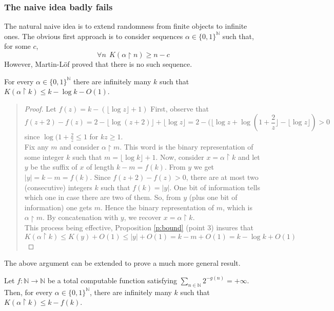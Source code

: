 \subsubsection{The naive idea badly fails}
The natural naive idea is to extend randomness from finite objects
to infinite ones.
The obvious first approach is to consider sequences
$\alpha\in{\{0,1\}^{\mathbb N}}$ such that, for some $c$,
\begin{equation}
\forall n\ \ K(\alpha{\!\upharpoonright \!} n)\geq n-c
\end{equation}
However, Martin-L\"of proved that there is no such sequence.
\begin{theorem}\label{thm:no}
For every $\alpha\in{\{0,1\}^{\mathbb N}}$ there are infinitely many $k$
such that $K(\alpha{\!\upharpoonright \!} k) \leq k-\log k -O(1)$.
\end{theorem}
{\small\begin{quote}
\begin{proof}
Let $f(z)= k -(\lfloor\log z\rfloor+1)$
First, observe that
$$
f(z+2)-f(z)
= 2 - \lfloor\log (z+2)\rfloor + \lfloor\log z\rfloor
= 2 - (\lfloor\log z + \log(1+\frac{2}{z}\rfloor
                                  - \lfloor\log z\rfloor)
>0
$$
since $\log(1+\frac{2}{z}\leq 1$ for $kz\geq1$.
\\
Fix any $m$ and consider $\alpha{\!\upharpoonright \!} m$.
This word is the binary representation of some integer $k$
such that $m=\lfloor\log k\rfloor +1$.
Now, consider $x=\alpha{\!\upharpoonright \!} k$ and let $y$ be the suffix
of $x$ of length $k-m=f(k)$.
From $y$ we get $|y|=k-m=f(k)$.
Since $f(z+2)-f(z)>0$, there are at most two (consecutive)
integers $k$ such that $f(k)=|y|$.
One bit of information tells which one in case there are two
of them.
So, from $y$ (plus one bit of information) one gets $m$.
Hence the binary representation of $m$,
which is $\alpha{\!\upharpoonright \!} m$.
By concatenation with $y$, we recover $x=\alpha{\!\upharpoonright \!} k$.
\\
This process being effective, Proposition \ref{p:bound}
(point 3) insures that
$$
K(\alpha{\!\upharpoonright \!} k) \leq K(y)+O(1) \leq |y|+O(1)
= k-m +O(1) = k-\log k +O(1)
$$
\end{proof}
\end{quote}}
The above argument can be extended to prove a much more general
result.
\begin{theorem}
\label{thm:osc}
Let $f:{\mathbb N}\to{\mathbb N}$ be a total computable function satisfying
$\sum_{n\in{\mathbb N}}2^{-g(n)}=+\infty$.
Then, for every $\alpha\in{\{0,1\}^{\mathbb N}}$, there are infinitely many $k$
such that $K(\alpha{\!\upharpoonright \!} k) \leq k-f(k)$.
\end{theorem}
